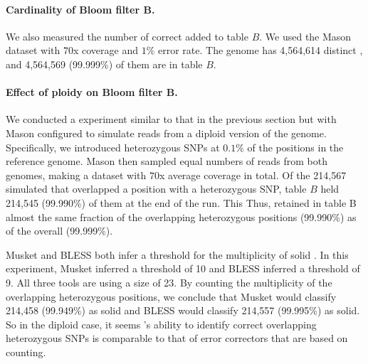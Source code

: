 \documentclass{bmcart}
\begin{document}


\paragraph{Cardinality of Bloom filter B.}  We also measured the number of correct \kmers added to table $B$. We used the Mason dataset with $70$x coverage and $1\%$ error rate. The \ecoli genome has 4,564,614 distinct \kmers, and 4,564,569 (99.999\%) of them are in table $B$.  

\paragraph{Effect of ploidy on Bloom filter B.}  We conducted a experiment similar to that in the previous section but with Mason configured to simulate reads from a diploid version of the \ecoli genome.
Specifically, we introduced heterozygous SNPs at $0.1\%$ of the positions in the reference genome.
Mason then sampled equal numbers of reads from both genomes, making a dataset with $70$x average coverage in total.
Of the 214,567 simulated \kmers that overlapped a position with a heterozygous SNP, table $B$ held 214,545 (99.990\%) of them at the end of the run. This
Thus, \tool retained in table B almost the same fraction of the \kmers overlapping heterozygous positions (99.990\%) as of the \kmers overall (99.999\%).

Musket and BLESS both infer a threshold for the multiplicity of solid \kmers. In this experiment, Musket inferred a threshold of 10 and BLESS inferred a threshold of 9.
All three tools are using a \kmer size of 23.
By counting the multiplicity of the \kmers overlapping heterozygous positions, we conclude that Musket would classify 214,458 (99.949\%) as solid and BLESS would classify 214,557 (99.995\%) as solid.
So in the diploid case, it seems \tool's ability to identify correct \kmers overlapping heterozygous SNPs is comparable to that of error correctors that are based on counting.
\end{document}
